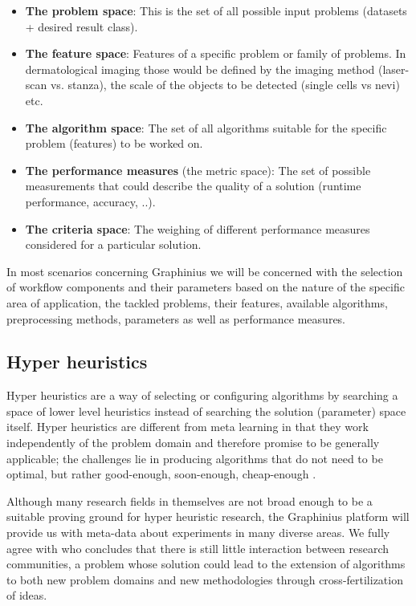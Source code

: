 \begin{itemize}
	\item \textbf{The problem space}: This is the set of all possible input problems (datasets + desired result class).
	
	\item \textbf{The feature space}: Features of a specific problem or family of problems. In dermatological imaging those would be defined by the imaging method (laser-scan vs. stanza), the scale of the objects to be detected (single cells vs nevi) etc.
	
	\item \textbf{The algorithm space}: The set of all algorithms suitable for the specific problem (features) to be worked on.
	
	\item \textbf{The performance measures} (the metric space): The set of possible measurements that could describe the quality of a solution (runtime performance, accuracy, ..).
	
	\item \textbf{The criteria space}: The weighing of different performance measures considered for a particular solution.
\end{itemize}


In most scenarios concerning Graphinius we will be concerned with the selection of workflow components and their parameters based on the nature of the specific area of application, the tackled problems, their features, available algorithms, preprocessing methods, parameters as well as performance measures.

\subsection{Hyper heuristics}
\label{ssect:hyper_heuristics}

Hyper heuristics are a way of selecting or configuring algorithms by searching a space of lower level heuristics instead of searching the solution (parameter) space itself. Hyper heuristics are different from meta learning in that they work independently of the problem domain and therefore promise to be generally applicable; the challenges lie in producing algorithms that do not need to be optimal, but rather good-enough, soon-enough, cheap-enough \citep{Burke:2003:Hyperheuristics}.

Although many research fields in themselves are not broad enough to be a suitable proving ground for hyper heuristic research, the Graphinius platform will provide us with meta-data about experiments in many diverse areas. We fully agree with \cite{Burke2013} who concludes that there is still little interaction between research communities, a problem whose solution could lead to the extension of algorithms to both new problem domains and new methodologies through cross-fertilization of ideas.



